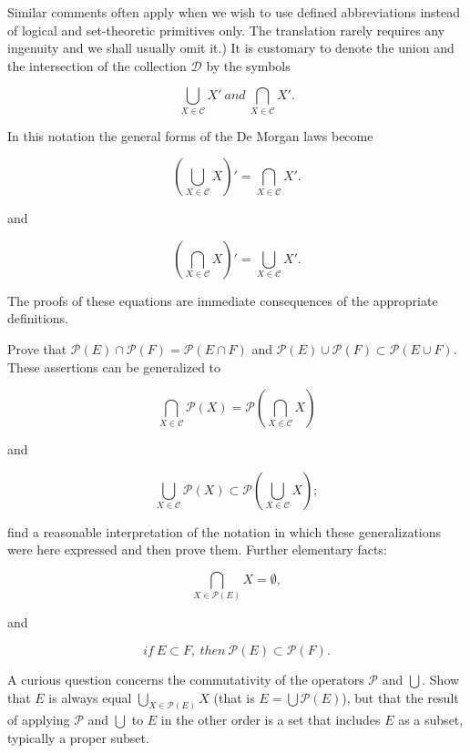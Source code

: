 Similar comments often apply when we wish to use defined abbreviations instead of logical and set-theoretic primitives only. The translation rarely requires any ingenuity and we shall usually omit it.) It is customary to denote the union and the intersection of the collection $ \mathcal{D} $ by the symbols  

\begin{equation*}
\bigcup_{X \in \mathcal{C}} X' \: and \: \bigcap_{X \in \mathcal{C}} X' .
\end{equation*}

In this notation the general forms of the De Morgan laws become 

\begin{equation*}
( \bigcup_{X \in \mathcal{C}} X)' = \bigcap_{X \in \mathcal{C}} X' .
\end{equation*}

and 

\begin{equation*}
( \bigcap_{X \in \mathcal{C}} X)' = \bigcup_{X \in \mathcal{C}} X' .
\end{equation*}

The proofs of these equations are immediate consequences of the appropriate definitions. 

\begin{exercise} Prove that $ \mathcal{P} (E) \cap \mathcal{P} (F) = \mathcal{P}(E \cap F) $ and $ \mathcal{P} (E) \cup \mathcal{P} (F) \subset \mathcal{P}(E \cup F) $. These assertions can be generalized to 

\begin{equation*}
\bigcap_{X \in \mathcal{C}} \mathcal{P} (X) = \mathcal{P} ( \bigcap_{X \in \mathcal{C}} X)
\end{equation*}

and

\begin{equation*}
\bigcup_{X \in \mathcal{C}} \mathcal{P} (X) \subset \mathcal{P} ( \bigcup_{X \in \mathcal{C}} X) ;
\end{equation*}

find a reasonable interpretation of the notation in which these generalizations were here expressed and then prove them. Further  elementary facts: 

\begin{equation*}
\bigcap_{X \in \mathcal{P} (E)} X = \emptyset ,
\end{equation*}

and 

\begin{equation*}
if \: E \subset F , \: then \: \mathcal{P} (E) \subset \mathcal{P} (F).
\end{equation*}

A curious question concerns the commutativity of the operators $ \mathcal{P} $ and $ \bigcup $. Show that $E$ is always equal $\bigcup_{X \in \mathcal{P} (E)} X $ (that is $ E = \bigcup \mathcal{P} (E) $), but that the result of applying $\mathcal{P} $ and $ \bigcup $ to $E$ in the other order is a set that includes $E$ as a subset, typically a proper subset.
\end{exercise}